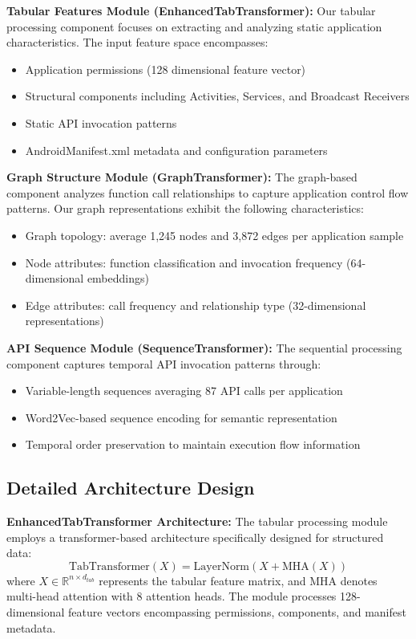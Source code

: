 \documentclass[a4paper,11pt]{article}
\begin{document}
\textbf{Tabular Features Module (EnhancedTabTransformer):}
Our tabular processing component focuses on extracting and analyzing static application characteristics. The input feature space encompasses:
\begin{itemize}
  \item Application permissions (128 dimensional feature vector)
  \item Structural components including Activities, Services, and Broadcast Receivers
  \item Static API invocation patterns
  \item AndroidManifest.xml metadata and configuration parameters
\end{itemize}

\textbf{Graph Structure Module (GraphTransformer):}
The graph-based component analyzes function call relationships to capture application control flow patterns. Our graph representations exhibit the following characteristics:
\begin{itemize}
  \item Graph topology: average 1,245 nodes and 3,872 edges per application sample
  \item Node attributes: function classification and invocation frequency (64-dimensional embeddings)
  \item Edge attributes: call frequency and relationship type (32-dimensional representations)
\end{itemize}

\textbf{API Sequence Module (SequenceTransformer):}
The sequential processing component captures temporal API invocation patterns through:
\begin{itemize}
  \item Variable-length sequences averaging 87 API calls per application
  \item Word2Vec-based sequence encoding for semantic representation
  \item Temporal order preservation to maintain execution flow information
\end{itemize}

\subsection{Detailed Architecture Design}

\textbf{EnhancedTabTransformer Architecture:}
The tabular processing module employs a transformer-based architecture specifically designed for structured data:
\begin{equation}
\text{TabTransformer}(X) = \text{LayerNorm}(X + \text{MHA}(X))
\end{equation}
where $X \in \mathbb{R}^{n \times d_{tab}}$ represents the tabular feature matrix, and MHA denotes multi-head attention with 8 attention heads. The module processes 128-dimensional feature vectors encompassing permissions, components, and manifest metadata.
\end{document}
